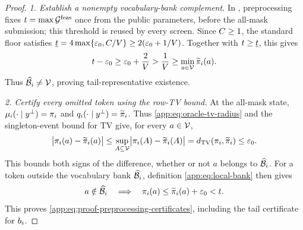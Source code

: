 \begin{proof}

\emph{1. Establish a nonempty vocabulary-bank complement.}
In , preprocessing fixes
$t=\max\mathcal G^{\mathrm{feas}}$ once from the
public parameters, before the all-mask submission; this threshold is reused
by every screen.
Since $C\ge1$, the standard floor satisfies
$\underline t=4\max\{\varepsilon_0,C/V\}
\ge2(\varepsilon_0+1/V)$.
Together with $t\ge\underline t$, this gives
\begin{equation}
 t-\varepsilon_0
 \ge\varepsilon_0+\frac2{V}
 >\frac1{V}
 \ge\min_{a\in\mathcal V}\widetilde\pi_{i}(a).
 \label{app:eq:baseline-existence}
\end{equation}
Thus $\widehat{\mathcal B}_{i}\ne\mathcal V$, proving tail-representative existence.

\emph{2. Certify every omitted token using the row-TV bound.}
At the all-mask state, $\mu_{i}(\cdot\mid y^\perp)=\pi_{i}$ and
$q_{i}(\cdot\mid y^\perp)=\widetilde\pi_{i}$.
Thus \eqref{app:eq:oracle-tv-radius} and the singleton-event bound for TV give,
for every $a\in\mathcal V$,
\[
 \bigl|\pi_{i}(a)-\widetilde\pi_{i}(a)\bigr|
 \le \sup_{A\subseteq\mathcal V}
       \bigl|\pi_{i}(A)-\widetilde\pi_{i}(A)\bigr|
 =d_{\mathrm{TV}}(\pi_{i},\widetilde\pi_{i})
 \le\varepsilon_0.
\]
This bounds both signs of the difference, whether or not $a$ belongs to
$\widehat{\mathcal B}_{i}$.  For a token outside the vocabulary bank $\widehat{\mathcal B}_{i}$,
definition \eqref{app:eq:local-bank} then gives
\begin{equation}
 a\notin\widehat{\mathcal B}_{i}
 \quad\Longrightarrow\quad
 \pi_{i}(a)
 \le\widetilde\pi_{i}(a)+\varepsilon_0<t.
 \label{app:eq:bank-complement-tail}
\end{equation}
This proves \eqref{app:eq:proof-preprocessing-certificates}, including the
tail certificate for $b_{i}$.



\end{proof}
